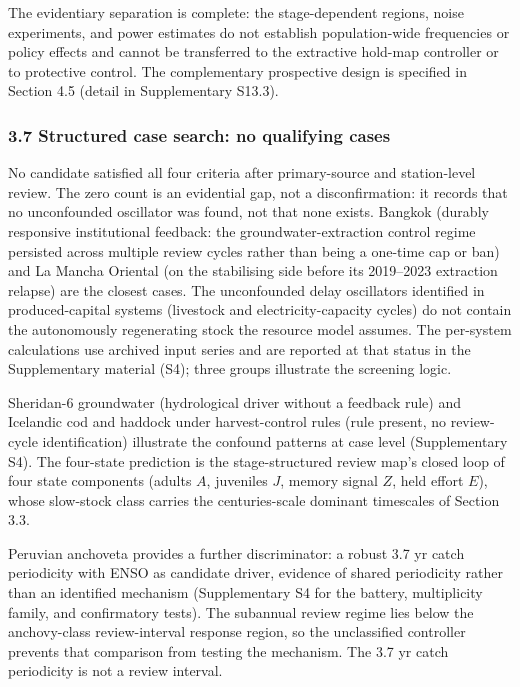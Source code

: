 \documentclass[11pt]{article}
\begin{document}
The evidentiary separation is complete: the stage-dependent regions, noise
experiments, and power estimates do not establish population-wide
frequencies or policy effects and cannot be transferred to the
extractive hold-map controller or to protective control. The complementary prospective design is specified in Section 4.5 (detail in Supplementary S13.3).

\subsubsection{3.7 Structured case search: no qualifying cases}\label{the-zero-count-case-search}

No candidate satisfied all four criteria after primary-source and station-level review. The zero count is an evidential gap, not a disconfirmation: it records that no unconfounded oscillator was found, not that none exists. Bangkok (durably responsive institutional feedback: the groundwater-extraction control regime persisted across multiple review cycles rather than being a one-time cap or ban) and La Mancha Oriental (on the
stabilising side before its 2019--2023 extraction relapse) are the
closest cases. The unconfounded delay oscillators identified in
produced-capital systems (livestock and electricity-capacity cycles) do
not contain the autonomously regenerating stock the resource model
assumes. The per-system calculations use archived input series and are reported at that status in the
Supplementary material (S4); three groups illustrate the screening logic.

Sheridan-6 groundwater (hydrological driver without a feedback rule) and Icelandic cod and haddock under harvest-control rules (rule present, no review-cycle identification) illustrate the confound patterns at case level (Supplementary S4). The four-state prediction is the stage-structured review map's closed loop of four state components (adults \(A\), juveniles \(J\), memory signal \(Z\), held effort \(E\)), whose slow-stock class carries the centuries-scale dominant timescales of Section 3.3.

Peruvian anchoveta provides a further discriminator: a robust 3.7 yr catch periodicity with ENSO as candidate driver, evidence of shared periodicity rather than an identified mechanism (Supplementary S4 for the battery, multiplicity family, and confirmatory tests). The subannual review regime lies below the anchovy-class review-interval response region, so the unclassified controller prevents that comparison from testing the mechanism. The 3.7 yr catch periodicity is not a review interval.
\end{document}

